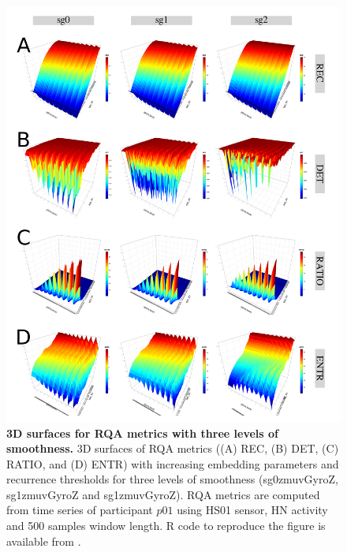 \begin{figure}[!ht]
\centering
\includegraphics[width=1.0\textwidth]{s}
    \caption{
	{\bf 3D surfaces for RQA metrics with three levels of smoothness.}
	3D surfaces of RQA metrics ((A) REC, (B) DET, (C) RATIO, and (D) ENTR) 
	with increasing embedding parameters and recurrence thresholds for 
	three levels of smoothness 
	(sg0zmuvGyroZ, sg1zmuvGyroZ and sg1zmuvGyroZ).
	RQA metrics are computed from time series of participant $p01$ using 
	HS01 sensor, HN activity and 500 samples window length.
	R code to reproduce the figure is available from \cite{hwum2018}.
 }
\label{fig:topo_smoothness}
\end{figure}



\newpage
